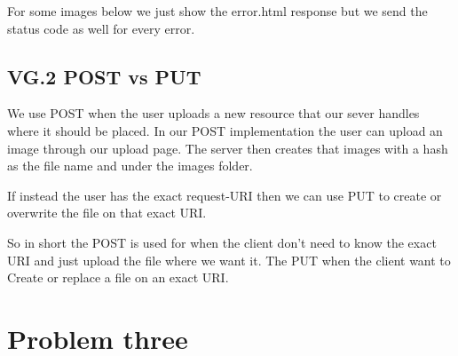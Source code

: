 \documentclass[a4paper,12pt]{article}
\numberwithin{figure}{section}
\begin{document}
For some images below we just show the error.html response but we send the status code as well for every error.



\newpage
\subsection{VG.2 POST vs PUT}

We use POST when the user uploads a new resource that our sever handles where it should be placed. In our POST implementation the user can upload an image through our upload page. The server then creates that images with a hash as the file name and under the images folder.  

If instead the user has the exact request-URI then we can use PUT to create or overwrite the file on that exact URI. 

So in short the POST is used for when the client don't need to know the exact URI and just upload the file where we want it. The PUT when the client want to Create or replace a file on an exact URI.

\newpage

\section{Problem three}
\end{document}
